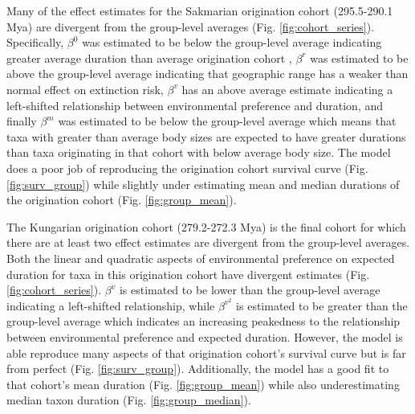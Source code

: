 \documentclass[11pt]{article}
\begin{document}
Many of the effect estimates for the Sakmarian origination cohort (295.5-290.1 Mya) are divergent from the group-level averages (Fig. \ref{fig:cohort_series}). Specifically, \(\beta^{0}\) was estimated to be below the group-level average indicating greater average duration than average origination cohort , \(\beta^{r}\) was estimated to be above the group-level average indicating that geographic range has a weaker than normal effect on extinction risk, \(\beta^{v}\) has an above average estimate indicating a left-shifted relationship between environmental preference and duration, and finally \(\beta^{m}\) was estimated to be below the group-level average which means that taxa with greater than average body sizes are expected to have greater durations than taxa originating in that cohort with below average body size. The model does a poor job of reproducing the origination cohort survival curve (Fig. \ref{fig:surv_group}) while slightly under estimating mean and median durations of the origination cohort (Fig. \ref{fig:group_mean}).

The Kungarian origination cohort (279.2-272.3 Mya) is the final cohort for which there are at least two effect estimates are divergent from the group-level averages. Both the linear and quadratic aspects of environmental preference on expected duration for taxa in this origination cohort have divergent estimates (Fig. \ref{fig:cohort_series}). \(\beta^{v}\) is estimated to be lower than the group-level average indicating a left-shifted relationship, while \(\beta^{v^{2}}\) is estimated to be greater than the group-level average which indicates an increasing peakedness to the relationship between environmental preference and expected duration. However, the model is able reproduce many aspects of that origination cohort's survival curve but is far from perfect (Fig. \ref{fig:surv_group}). Additionally, the model has a good fit to that cohort's mean duration (Fig. \ref{fig:group_mean}) while also underestimating median taxon duration (Fig. \ref{fig:group_median}).
\end{document}

